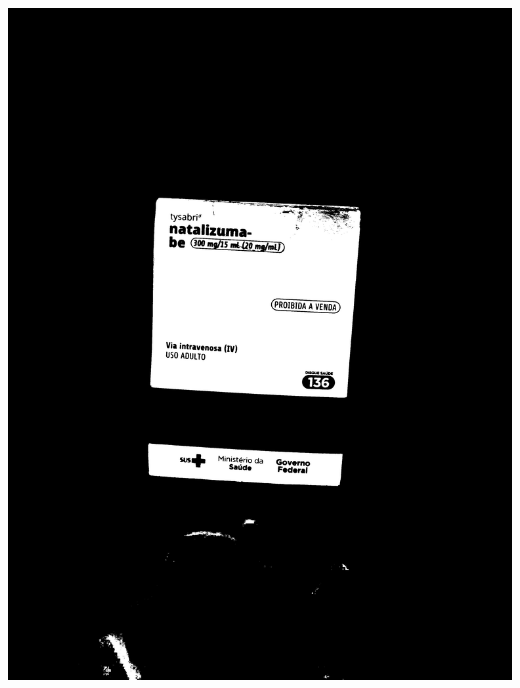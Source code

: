 \begin{frame}
	\centering
	\begin{columns}
		\begin{column}{0.24\textwidth}\centering
			\includegraphics[height=0.35\textheight]{../pictures/tysabri_cmyk_c_only_thresh.jpg}
			\\\vspace{\floatsep}

\end{column}
\end{columns}
\end{frame}
